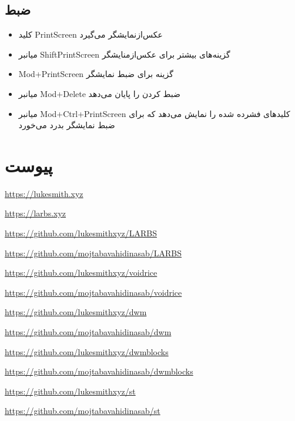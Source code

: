 \documentclass{article}
\newcommand{\s}[1]{\textenglish{Mod+#1}}
\begin{document}
\subsection{ضبط}
\begin{itemize}
		 \item کلید PrintScreen عکس‌ازنمایشگر می‌گیرد
		 \item میانبر \textenglish{ShiftPrintScreen} گزینه‌های بیشتر برای عکس‌ازمنایشگر
		 \item \s{PrintScreen} گزینه برای ضبط نمایشگر
		 \item میانبر \s{Delete} ضبط کردن را پایان می‌دهد
		 \item میانبر \s{Ctrl+PrintScreen} کلیدهای فشرده شده را نمایش می‌دهد که برای ضبط نمایشگر بدرد می‌خورد
\end{itemize}
\appendix
\section{پیوست}
\raggedright\href{https://lukesmith.xyz}{https://lukesmith.xyz}\bigskip

\raggedright\href{https://larbs.xyz}{https://larbs.xyz}\bigskip

\raggedright\href{https://github.com/lukesmithxyz/LARBS}{https://github.com/lukesmithxyz/LARBS}\bigskip

\raggedright\href{https://github.com/mojtabavahidinasab/LARBS}{https://github.com/mojtabavahidinasab/LARBS}\bigskip

\raggedright\href{https://github.com/lukesmithxyz/voidrice}{https://github.com/lukesmithxyz/voidrice}\bigskip

\raggedright\href{https://github.com/mojtabavahidinasab/voidrice}{https://github.com/mojtabavahidinasab/voidrice}\bigskip

\raggedright\href{https://github.com/lukesmithxyz/dwm}{https://github.com/lukesmithxyz/dwm}\bigskip

\raggedright\href{https://github.com/mojtabavahidinasab/dwm}{https://github.com/mojtabavahidinasab/dwm}\bigskip

\raggedright\href{https://github.com/lukesmithxyz/dwmblocks}{https://github.com/lukesmithxyz/dwmblocks}\bigskip

\raggedright\href{https://github.com/mojtabavahidinasab/dwmblocks}{https://github.com/mojtabavahidinasab/dwmblocks}\bigskip

\raggedright\href{https://github.com/lukesmithxyz/st}{https://github.com/lukesmithxyz/st}\bigskip

\raggedright\href{https://github.com/mojtabavahidinasab/st}{https://github.com/mojtabavahidinasab/st}\bigskip
\end{document}
